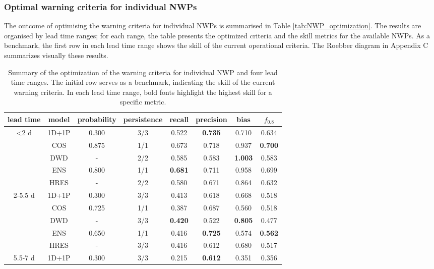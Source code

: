 \documentclass{ametsocV6.1}
\begin{document}
\subsubsection{Optimal warning criteria for individual NWPs}
\label{sec:NWP_optimal_criteria}

The outcome of optimising the warning criteria for individual NWPs is summarised in Table \ref{tab:NWP_optimization}. The results are organised by lead time ranges; for each range, the table presents the optimized criteria and the skill metrics for the available NWPs. As a benchmark, the first row in each lead time range shows the skill of the current operational criteria. The Roebber diagram in Appendix C summarizes visually these results.
\begin{table}
    \centering
    \caption{Summary of the optimization of the warning criteria for individual NWP and four lead time ranges. The initial row serves as a benchmark, indicating the skill of the current warning criteria. In each lead time range, bold fonts highlight the highest skill for a specific metric.}
    \begin{tabular}{cccccccc}
        \toprule
        lead time & model & probability & persistence & recall & precision & bias & $f_{0.8}$\\
        \midrule
        \textless 2 d & 1D+1P & 0.300& 3/3 & 0.522 & \textbf{0.735} & 0.710 & 0.634 \\
         & COS & 0.875 & 1/1 & 0.673 & 0.718 & 0.937 & \textbf{0.700} \\
         & DWD & - & 2/2 & 0.585 & 0.583 & \textbf{1.003} & 0.583 \\
         & ENS& 0.800 & 1/1 & \textbf{0.681} & 0.711 & 0.958 & 0.699 \\
         & HRES& -& 2/2 & 0.580 & 0.671 & 0.864 & 0.632 \\
         \midrule
        2-5.5 d & 1D+1P & 0.300& 3/3 & 0.413 & 0.618 & 0.668 & 0.518 \\
         & COS & 0.725 & 1/1 & 0.387 & 0.687 & 0.560 & 0.518 \\
         & DWD & - & 3/3 & \textbf{0.420} & 0.522 & \textbf{0.805} & 0.477 \\
         & ENS & 0.650 & 1/1 & 0.416 & \textbf{0.725} & 0.574 & \textbf{0.562} \\
         & HRES & - & 3/3 & 0.416 & 0.612 & 0.680 & 0.517 \\
         \midrule
        5.5-7 d & 1D+1P & 0.300& 3/3 & 0.215 & \textbf{0.612} & 0.351 & 0.356 \\

\end{tabular}
\end{table}
\end{document}
